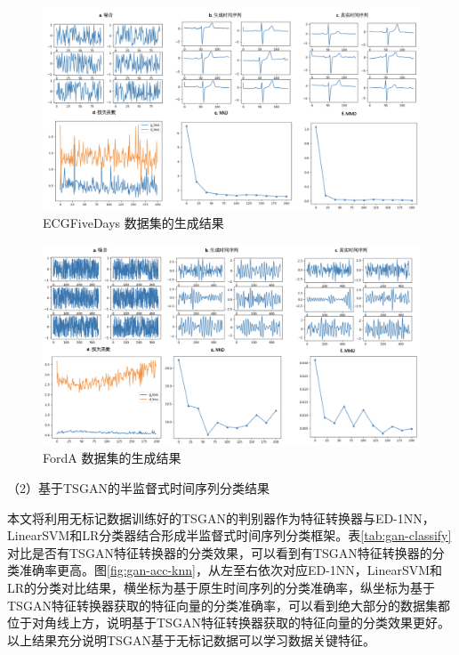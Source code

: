 \begin{figure}[H]
\centering
\includegraphics[scale=0.5]{figures/gan/ECGFiveDays.png}
\caption{ECGFiveDays 数据集的生成结果}
\label{fig:gan-show-ECGFiveDays}
\end{figure}
\begin{figure}[H]
\centering
\includegraphics[scale=0.5]{figures/gan/FordA.png}
\caption{FordA 数据集的生成结果}
\label{fig:gan-show-FordA}
\end{figure}

（2）基于TSGAN的半监督式时间序列分类结果

本文将利用无标记数据训练好的TSGAN的判别器作为特征转换器与ED-1NN，LinearSVM和LR分类器结合形成半监督式时间序列分类框架。表\ref{tab:gan-classify}对比是否有TSGAN特征转换器的分类效果，可以看到有TSGAN特征转换器的分类准确率更高。图\ref{fig:gan-acc-knn}，从左至右依次对应ED-1NN，LinearSVM和LR的分类对比结果，横坐标为基于原生时间序列的分类准确率，纵坐标为基于TSGAN特征转换器获取的特征向量的分类准确率，可以看到绝大部分的数据集都位于对角线上方，说明基于TSGAN特征转换器获取的特征向量的分类效果更好。以上结果充分说明TSGAN基于无标记数据可以学习数据关键特征。

